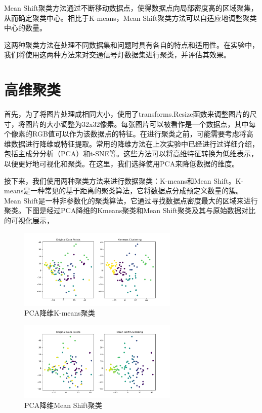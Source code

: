 \documentclass[lettersize,journal]{IEEEtran}
\begin{document}
Mean Shift聚类方法通过不断移动数据点，使得数据点向局部密度高的区域聚集，从而确定聚类中心。相比于K-means，Mean Shift聚类方法可以自适应地调整聚类中心的数量。

这两种聚类方法在处理不同数据集和问题时具有各自的特点和适用性。在实验中，我们将使用这两种方法来对交通信号灯数据集进行聚类，并评估其效果。

\section{高维聚类}

首先，为了将图片处理成相同大小，使用了transforms.Resize函数来调整图片的尺寸，将图片的大小调整为32x32像素。每张图片可以被看作是一个数据点，其中每个像素的RGB值可以作为该数据点的特征。在进行聚类之前，可能需要考虑将高维数据进行降维或特征提取。常用的降维方法在上次实验中已经进行过详细介绍，包括主成分分析（PCA）和t-SNE等。这些方法可以将高维特征转换为低维表示，以便更好地可视化和聚类。在这里，我们选择使用PCA来降低数据的维度。

接下来，我们使用两种聚类方法来进行数据聚类：K-means和Mean Shift。K-means是一种常见的基于距离的聚类算法，它将数据点分成预定义数量的簇。Mean Shift是一种非参数化的聚类算法，它通过寻找数据点密度最大的区域来进行聚类。下图是经过PCA降维的K\-means聚类和Mean Shift聚类及其与原始数据对比的可视化展示，

\begin{figure}[H]
\centering
\includegraphics[width=3in]{image/Figure_1.png}
\caption{PCA降维K-means聚类}
\end{figure}

\begin{figure}[H]
\centering
\includegraphics[width=3in]{image/Figure_2.png}
\caption{PCA降维Mean Shift聚类}
\end{figure}
\end{document}
